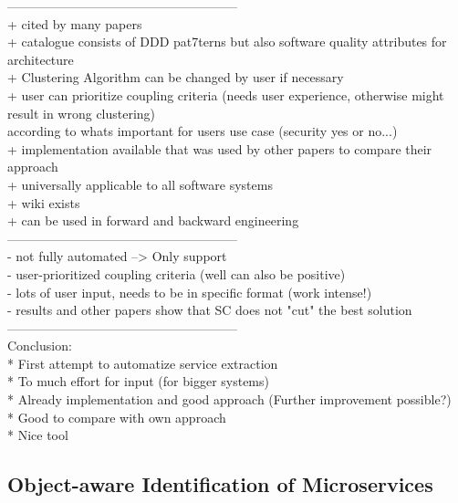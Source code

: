 ------------------------------------------------------\\



+ cited by many papers \\
+ catalogue consists of DDD pat7terns but also software quality attributes for architecture\\
+ Clustering Algorithm can be changed by user if necessary\\
+ user can prioritize coupling criteria (needs user experience, otherwise might result in wrong clustering)\\ according to whats important for users use case (security yes or no...)\\
+ implementation available that was used by other papers to compare their approach\\
+ universally applicable to all software systems\\
+ wiki exists\\
+ can be used in forward  and backward engineering\\

------------------------------------------------------\\

- not fully automated --> Only support\\
- user-prioritized coupling criteria (well can also be positive)\\
- lots of user input, needs to be in specific format (work intense!)\\
- results and other papers show that SC does not "cut" the best solution\\

------------------------------------------------------\\
Conclusion:\\
* First attempt to automatize service extraction\\
* To much effort for input (for bigger systems)\\
* Already implementation and good approach (Further improvement possible?)\\
* Good to compare with own approach\\
* Nice tool\\


\subsection{Object-aware Identification of Microservices}

